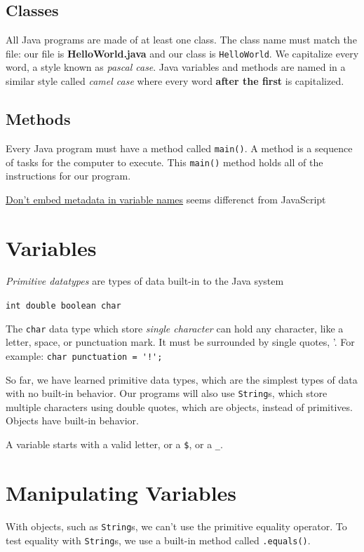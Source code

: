 \documentclass[a4paper, 12pt]{article}
\begin{document}
\subsection{Classes}
All Java programs are made of at least one class. The class name must match the file: our file is \textbf{HelloWorld.java} and our class is \verb|HelloWorld|. We capitalize every word, a style known as \textit{pascal case}. Java variables and methods are named in a similar style called \textit{camel case} where every word \textbf{after the first} is capitalized.

\subsection{Methods}
Every Java program must have a method called \verb|main()|. A method is a sequence of tasks for the computer to execute. This \verb|main()| method holds all of the instructions for our program.

\href{https://github.com/twitter/commons/blob/master/src/java/com/twitter/common/styleguide.md#dont-embed-metadata-in-variable-names}{Don't embed metadata in variable names} seems differenct from JavaScript


\section{Variables}
\textit{Primitive datatypes} are types of data built-in to the Java system

\verb|int double boolean char|

The \verb|char| data type which store \textit{single character} can hold any character, like a letter, space, or punctuation mark. It must be surrounded by single quotes, '. For example:
\verb|char punctuation = '!';|

So far, we have learned primitive data types, which are the simplest types of data with no built-in behavior. Our programs will also use \verb|String|s, which store multiple characters using double quotes, which are objects, instead of primitives. Objects have built-in behavior.

A variable starts with a valid letter, or a \verb|$|, or a \verb|_|.


\section{Manipulating Variables}
With objects, such as \verb|String|s, we can't use the primitive equality operator. To test equality with \verb|String|s, we use a built-in method called \verb|.equals()|.
\end{document}
